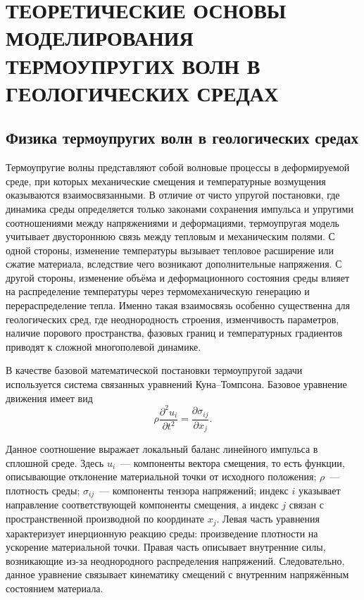 \chapter{ТЕОРЕТИЧЕСКИЕ ОСНОВЫ МОДЕЛИРОВАНИЯ ТЕРМОУПРУГИХ ВОЛН В ГЕОЛОГИЧЕСКИХ СРЕДАХ}

\section{Физика термоупругих волн в геологических средах}

Термоупругие волны представляют собой волновые процессы в деформируемой среде, при которых механические смещения и температурные возмущения оказываются взаимосвязанными. В отличие от чисто упругой постановки, где динамика среды определяется только законами сохранения импульса и упругими соотношениями между напряжениями и деформациями, термоупругая модель учитывает двустороннюю связь между тепловым и механическим полями. С одной стороны, изменение температуры вызывает тепловое расширение или сжатие материала, вследствие чего возникают дополнительные напряжения. С другой стороны, изменение объёма и деформационного состояния среды влияет на распределение температуры через термомеханическую генерацию и перераспределение тепла. Именно такая взаимосвязь особенно существенна для геологических сред, где неоднородность строения, изменчивость параметров, наличие порового пространства, фазовых границ и температурных градиентов приводят к сложной многополевой динамике.

В качестве базовой математической постановки термоупругой задачи используется система связанных уравнений Куна--Томпсона. Базовое уравнение движения имеет вид
\begin{equation}
\rho \frac{\partial^2 u_i}{\partial t^2}=\frac{\partial \sigma_{ij}}{\partial x_j}.
\end{equation}

Данное соотношение выражает локальный баланс линейного импульса в сплошной среде. Здесь $u_i$~--- компоненты вектора смещения, то есть функции, описывающие отклонение материальной точки от исходного положения; $\rho$~--- плотность среды; $\sigma_{ij}$~--- компоненты тензора напряжений; индекс $i$ указывает направление соответствующей компоненты смещения, а индекс $j$ связан с пространственной производной по координате $x_j$. Левая часть уравнения характеризует инерционную реакцию среды: произведение плотности на ускорение материальной точки. Правая часть описывает внутренние силы, возникающие из-за неоднородного распределения напряжений. Следовательно, данное уравнение связывает кинематику смещений с внутренним напряжённым состоянием материала.

